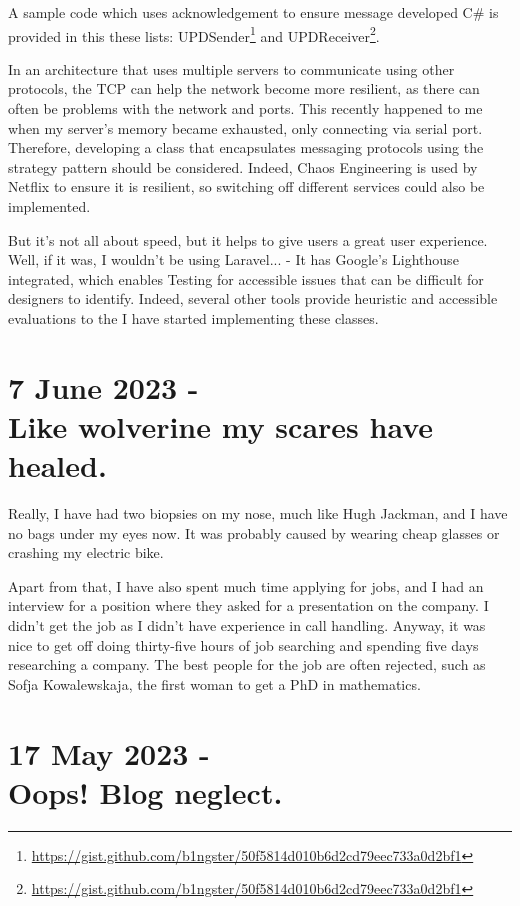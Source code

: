 \documentclass{article}
\newcommand\footurl[1]{\footnote{\url{#1}}}
\newcommand\urllink[2]{#1\footurl{#2}}
\begin{document}
 A sample code which uses acknowledgement to ensure message developed C\# is provided in this these lists: \urllink{UPDSender}{https://gist.github.com/b1ngster/50f5814d010b6d2cd79eec733a0d2bf1} and \urllink{UPDReceiver}{https://gist.github.com/b1ngster/50f5814d010b6d2cd79eec733a0d2bf1}. 

In an architecture that uses multiple servers to communicate using other protocols, the TCP can help the network become more resilient, as there can often be problems with the network and ports. This recently happened to me when my server's memory became exhausted, only connecting via serial port. Therefore, developing a class that encapsulates messaging protocols using the strategy pattern should be considered. Indeed, Chaos Engineering is used by Netflix to ensure it is resilient, so switching off different services could also be implemented. 

But it's not all about speed, but it helps to give users a great user experience. Well, if it was, I wouldn't be using Laravel... - It has Google's Lighthouse integrated, which enables Testing for accessible issues that can be difficult for designers to identify. Indeed, several other tools provide heuristic and accessible evaluations to the I have started implementing these classes.



\section*{7 June 2023 - \\ Like wolverine my scares have healed.}

Really, I have had two biopsies on my nose, much like Hugh Jackman, and I have no bags under my eyes now. It was probably caused by wearing cheap glasses or crashing my electric bike. 

Apart from that, I have also spent much time applying for jobs, and I had an interview for a position where they asked for a presentation on the company. I didn't get the job as I didn't have experience in call handling. Anyway, it was nice to get off doing thirty-five hours of job searching and spending five days researching a company. The best people for the job are often rejected, such as Sofja Kowalewskaja, the first woman to get a PhD in mathematics.

\section*{17 May 2023 - \\ Oops! Blog neglect.}
\end{document}
